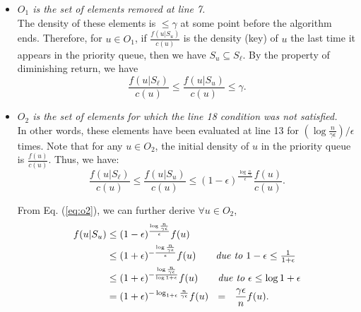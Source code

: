 \documentclass[10pt]{article} %
\theoremstyle{remark}
\begin{document}
     \begin{itemize}
         \item \textit{$O_1$ is the set of elements removed at line 7.\ }\\
     The density of these elements is $\leq \gamma$ at some point before the algorithm ends. Therefore, for $u \in O_1$, if $\frac{f(u|S_u)}{c(u)}$ is the density (key) of $u$ the last time it appears in the priority queue, then we have $S_u \subseteq S_\ell$. By the property of diminishing return, we have
        \begin{equation}
        \label{eq:o1}
            \frac{f(u|S_\ell)}{c(u)} \leq \frac{f(u|S_u)}{c(u)} \leq \gamma.
        \end{equation}
        \item \textit{$O_2$ is the set of elements for which the line 18 condition was not satisfied.\ }\\
    In other words, these elements have been evaluated at line 13 for $(\log \frac{n}{\gamma\epsilon})/{\epsilon}$ times. Note that for any $u \in O_2$, the initial density of $u$ in the priority queue is $\frac{f(u)}{c(u)}$. Thus, we have: 
        \begin{equation}
            \label{eq:o2}
            \frac{f(u|S_\ell)}{c(u)} \leq \frac{f(u|S_u)}{c(u)} \leq (1-\epsilon)^{\frac{\log \frac{n}{\gamma \epsilon}}{\epsilon}}  \frac{f(u)}{c(u)}.
        \end{equation}
     
    From Eq. (\ref{eq:o2}), we can further derive $\forall u \in O_2$,
    \begin{align}
    \label{eq:derive-o2}
        f(u|S_u) &\leq (1-\epsilon)^{\frac{\log \frac{n}{\gamma \epsilon}}{\epsilon}} f(u) \nonumber\\
        &\leq (1+\epsilon)^{-\frac{\log \frac{n}{\gamma \epsilon}}{\epsilon}}f(u) \quad \quad \mbox{\it due to $1-\epsilon \leq \frac{1}{1+\epsilon}$} \nonumber\\
        &\leq (1+\epsilon)^{-\frac{\log \frac{n}{\gamma \epsilon}}{\log 1+\epsilon}}f(u) \quad \quad \mbox{\it due to $\epsilon \leq \log{1+\epsilon}$}\nonumber\\
        &= (1+\epsilon)^{-\log_{1+\epsilon} \frac{n}{\gamma \epsilon}}f(u) ~~=~~\frac{\gamma \epsilon}{n} f(u).
    \end{align}
    \end{itemize}
    
\end{document}

